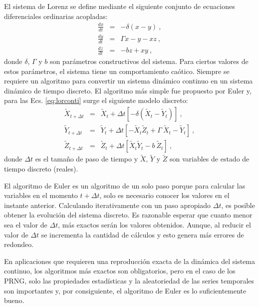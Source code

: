 El sistema de Lorenz se define mediante el siguiente conjunto de ecuaciones diferenciales ordinarias acopladas:
%
\begin{eqnarray} \label{eq:lorconti}
\frac{dx}{dt}&=&-\delta(x-y) \ , \nonumber \\
\frac{dy}{dt}&=&\Gamma x-y-xz \ , \\
\frac{dz}{dt}&=&-bz+xy \ , \nonumber
\end{eqnarray}
%
donde $\delta$, $\Gamma$ y $b$ son parámetros constructivos del sistema.
Para ciertos valores de estos parámetros, el sistema tiene un comportamiento caótico.
Siempre se requiere un algoritmo para convertir un sistema dinámico continuo en un sistema dinámico de tiempo discreto.
El algoritmo más simple fue propuesto por Euler y, para las Ecs. \ref{eq:lorconti} surge el siguiente modelo discreto:
%
\begin{eqnarray}\label{eq:loreuler}
{\widetilde X}_{t+\Delta t}&=&{\widetilde X}_{t}+ \Delta t \left[
- \delta \left( {\widetilde X}_{t}-{\widetilde Y}_{t} \right)
\right]
\ , \nonumber \\
{\widetilde Y}_{t+\Delta t}&=&{\widetilde Y}_{t}+ \Delta t \left[
-{\widetilde X}_{t}{\widetilde Z}_{t}+\Gamma~{\widetilde
X}_{t}-{\widetilde Y}_{t} \right] \ ,
\\
{\widetilde Z}_{t+\Delta t}&=&{\widetilde Z}_{t}+ \Delta t \left[
{\widetilde X}_{t}{\widetilde Y}_{t}-b~{\widetilde Z}_{t} \right]
\ , \nonumber
\end{eqnarray}
%
donde $\Delta t$ es el tamaño de paso de tiempo y $\widetilde X$, $\widetilde Y$ y $\widetilde Z$ son variables de estado de tiempo discreto (reales).

El algoritmo de Euler es un algoritmo de un solo paso porque para calcular las variables en el momento $t + \Delta t$, solo es necesario conocer los valores en el instante anterior.
Calculando iterativamente con un paso apropiado $\Delta t$, es posible obtener la evolución del sistema discreto.
Es razonable esperar que cuanto menor sea el valor de $\Delta t$, más exactos serán los valores obtenidos.
Aunque, al reducir el valor de $\Delta t$ se incrementa la cantidad de cálculos y esto genera más errores de redondeo.

En aplicaciones que requieren una reproducción exacta de la dinámica del sistema continuo, los algoritmos más exactos son obligatorios, pero en el caso de los PRNG, solo las propiedades estadísticas y la aleatoriedad de las series temporales son importantes y, por consiguiente, el algoritmo de Euler es lo suficientemente bueno.

